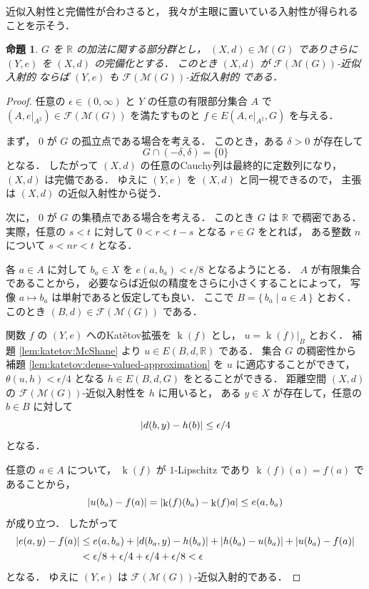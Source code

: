 \documentclass[leqno, 12pt]{jsarticle}
\newtheorem{prop}[thm]{命題}
\newcommand{\rr}{\mathbb{R}}
\DeclareMathOperator{\kat}{k}
\newcommand{\KatExt}[1]{\kat(#1)}
\DeclarePairedDelimiter{\abs}{\lvert}{\rvert}
\newcommand{\Met}[1]{\mathscr{M}(#1)}
\newcommand{\FinitePart}[1]{\mathscr{F}(#1)}
\newcommand{\FinMet}[1]{\FinitePart{\Met{#1}}}
\newcommand{\restr}[2]{#1|_{#2}}
\newcommand{\Espace}[3]{E(#1,#2,#3)}
\newcommand{\KatDist}{\theta}
\begin{document}
近似入射性と完備性が合わさると，
我々が主眼に置いている入射性が得られることを示そう．
\begin{prop}\label{prop:katetov:compapprxinj}
$G$
を
$\rr$
の加法に関する部分群とし，
$(X, d)\in \Met{G}$
でありさらに
$(Y, e)$
を
$(X, d)$
の完備化とする．
このとき
$(X, d)$
が
$\FinMet{G}$-近似入射的
ならば
$(Y, e)$
も
$\FinMet{G}$-近似入射的
である．
\end{prop}
\begin{proof}
任意の
$\epsilon \in (0, \infty)$
と
$Y$
の任意の有限部分集合
$A$
で
$\left(A,\restr{e}{A^2}\right)\in\FinMet{G}$
を満たすものと
$f\in\Espace{A}{\restr{e}{A^2}}{G}$
を与える．


まず，
$0$
が
$G$
の孤立点である場合を考える．
このとき，ある
$\delta>0$
が存在して
\[
G\cap(-\delta,\delta)=\{0\}
\]
となる．
したがって
$(X,d)$
の任意のCauchy列は最終的に定数列になり，
$(X,d)$
は完備である．
ゆえに
$(Y,e)$
を
$(X,d)$
と同一視できるので，
主張は
$(X,d)$
の近似入射性から従う．


次に，
$0$
が
$G$
の集積点である場合を考える．
このとき
$G$
は
$\rr$
で稠密である．
実際，任意の
$s<t$
に対して
$0<r<t-s$
となる
$r\in G$
をとれば，
ある整数
$n$
について
$s<nr<t$
となる．


各
$a\in A$
に対して
$b_a\in X$
を
$e(a,b_a)<\epsilon/8$
となるようにとる．
$A$
が有限集合であることから，
必要ならば近似の精度をさらに小さくすることによって，
写像
$a\mapsto b_{a}$
は単射であると仮定しても良い．
ここで
$B=\{\,b_{a}\mid a\in A\,\}$
とおく．
このとき
$(B,d)\in\FinMet{G}$
である．


関数
$f$
の
$(Y,e)$
へのKat\v{e}tov拡張を
$\KatExt{f}$
とし，
$u=\restr{\KatExt{f}}{B}$
とおく．
補題
\ref{lem:katetov:McShane}
より
$u\in\Espace{B}{d}{\rr}$
である．
集合
$G$
の稠密性から
補題
\ref{lem:katetov:dense-valued-approximation}
を
$u$
に適応することができて，
$\KatDist(u,h)<\epsilon/4$
となる
$h\in\Espace{B}{d}{G}$
をとることができる．
距離空間
$(X,d)$
の
$\FinMet{G}$-近似入射性を
$h$
に用いると，
ある
$y\in X$
が存在して，任意の
$b\in B$
に対して
\[
\abs{d(b,y)-h(b)}\le\epsilon/4
\]
となる．


任意の
$a\in A$
について，
$\KatExt{f}$
が
$1$-Lipschitz
であり
$\KatExt{f}(a)=f(a)$
であることから，
\[
\abs{u(b_{a})-f(a)}
=\abs{\KatExt{f}(b_{a})-\KatExt{f}{a}}
\le e(a, b_{a})
\]
が成り立つ．
したがって
\begin{align*}
\abs{e(a,y)-f(a)}
&\le e(a,b_a)
 +\abs{d(b_a,y)-h(b_a)}
 +\abs{h(b_a)-u(b_a)}
 +\abs{u(b_a)-f(a)}\\
&<\epsilon/8+\epsilon/4+\epsilon/4+\epsilon/8
<\epsilon
\end{align*}
となる．
ゆえに
$(Y,e)$
は
$\FinMet{G}$-近似入射的である．
\end{proof}
\end{document}
